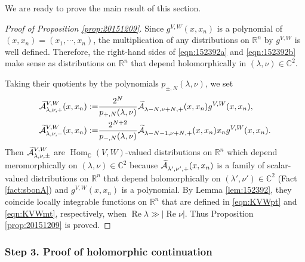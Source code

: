 We are ready to prove the main result
 of this section.  
\begin{proof}
[Proof of Proposition \ref{prop:20151209}]
Since $g^{V,W}(x,x_n)$ is a polynomial of $(x,x_n)=(x_1, \cdots, x_n)$, 
 the multiplication of any distributions
 on ${\mathbb{R}}^n$ 
 by $g^{V,W}$
 is well defined.  
Therefore, 
 the right-hand sides of \eqref{eqn:152392a} and \eqref{eqn:152392b}
 make sense as distributions on ${\mathbb{R}}^n$
 that depend holomorphically in $(\lambda, \nu) \in {\mathbb{C}}^2$.  

Taking their quotients
 by the polynomials $p_{\pm,N}(\lambda, \nu)$, 
 we set
\begin{align}
\label{eqn:pAVW+}
\widetilde{{\mathcal{A}}}_{{\lambda},{\nu},{+}}^{{V,W}}(x,x_n)
:=&
\frac{2^N}{p_{+,N}(\lambda,\nu)}
\widetilde{{\mathcal{A}}}_{{\lambda-N},{\nu+N},{+}}^{{}}(x,x_n)
g^{V,W}(x,x_n), 
\\
\label{eqn:pAVW-}
\widetilde{{\mathcal{A}}}_{{\lambda},{\nu},{-}}^{{V,W}}(x,x_n)
:=&
\frac{2^{N+2}}{p_{-,N}(\lambda,\nu)}
\widetilde{{\mathcal{A}}}_{{\lambda-N-1},{\nu+N},{+}}^{{}}(x,x_n)
x_n
g^{V,W}(x,x_n).  
\end{align}  
Then $\widetilde{{\mathcal{A}}}_{{\lambda},{\nu},{\pm}}^{{V,W}}$ are $\operatorname{Hom}_{\mathbb{C}}(V,W)$-valued distributions
 on ${\mathbb{R}}^n$
 which depend meromorphically on $(\lambda,\nu) \in {\mathbb{C}}^2$
 because $\widetilde{{\mathcal{A}}}_{{\lambda'},{\nu'},{+}}^{{}} (x,x_n)$ is a family of scalar-valued distributions 
 on ${\mathbb{R}}^n$ 
 that depend holomorphically on $(\lambda',\nu') \in {\mathbb{C}}^2$
(Fact \ref{fact:sbonA})
 and $g^{V,W}(x,x_n)$ is a polynomial.  
By Lemma \ref{lem:152392}, 
 they coincide locally integrable functions
 on ${\mathbb{R}}^n$
 that are defined in \eqref{eqn:KVWpt} and \eqref{eqn:KVWmt}, 
 respectively, 
 when $\operatorname{Re} \lambda \gg |\operatorname{Re} \nu|$.  
Thus Proposition \ref{prop:20151209} is proved.  
\end{proof}

\subsubsection{Step 3. Proof of holomorphic continuation}

